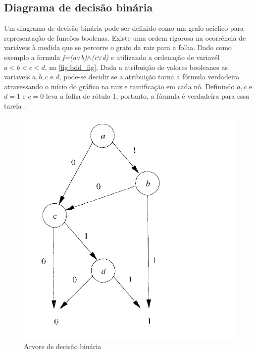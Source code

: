 \subsection{Diagrama de decisão binária}
Um diagrama de decisão binária pode ser definido como um grafo aciclico para representação de funcões boolenas. Existe uma ordem rigorosa na ocorrência de variáveis à medida que se percorre o grafo da raiz para a folha. Dado como exemplo a formula \textit{f=(a$\lor$b)$\land$(c$\lor$d)} e utilizando a ordenação de variavél $a < b < c < d$, na \autoref{fig:bdd_fig}. Dada a atribuição de valores booleanos as variaveis $a, b, c$ e $d$, pode-se decidir se a atribuição torna a fórmula verdadeira atravessando o início do gráfico na raiz e ramificação em cada nó. Definindo $a,c$ e $d = 1$ e $c = 0$ leva a folha de rótulo 1, portanto, a fórmula é verdadeira para essa tarefa~\cite{clarke1994model}.

\begin{figure}[htb]
	\begin{center}
    \caption{\label{fig:bdd_fig}Arvore de decisão binária}
	\includegraphics[scale=0.30]{Figuras/Arvore_BDD.png}
	\end{center}
\end{figure}

